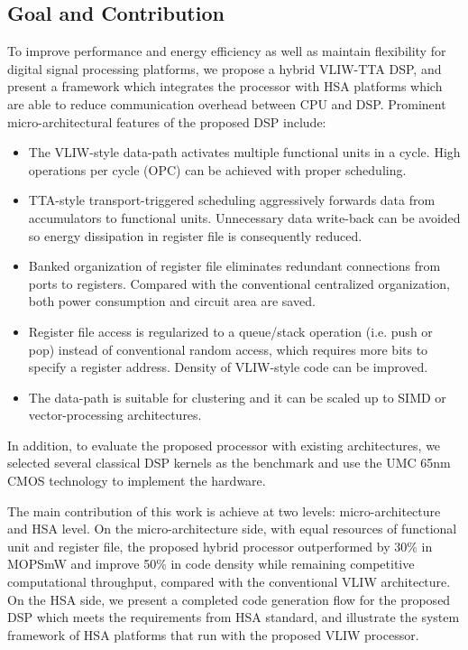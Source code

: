 \documentclass[12pt]{article}
\begin{document}
\begin{CJK}{UTF8}{bkai}
    \subsection{Goal and Contribution}
        To improve performance and energy efficiency as well as maintain flexibility for digital signal processing platforms, we propose a hybrid VLIW-TTA DSP, and present a framework which integrates the processor with HSA platforms which are able to reduce communication overhead between CPU and DSP. Prominent micro-architectural features of the proposed DSP include:
        \begin{itemize}
            \item The VLIW-style data-path activates multiple functional units in a cycle. High operations per cycle (OPC) can be achieved with proper scheduling.
            \item TTA-style transport-triggered scheduling aggressively forwards data from accumulators to functional units. Unnecessary data write-back can be avoided so energy dissipation in register file is consequently reduced.
            \item Banked organization of register file eliminates redundant connections from ports to registers. Compared with the conventional centralized organization, both power consumption and circuit area are saved.
            \item Register file access is regularized to a queue/stack operation (i.e. push or pop) instead of conventional random access, which requires more bits to specify a register address. Density of VLIW-style code can be improved.
            \item The data-path is suitable for clustering and it can be scaled up to SIMD or vector-processing architectures.
        \end{itemize}
        In addition, to evaluate the proposed processor with existing architectures, we selected several classical DSP kernels \cite{dspstone} \cite{bdti} as the benchmark and use the UMC 65nm CMOS technology to implement the hardware.

        The main contribution of this work is achieve at two levels: micro-architecture and HSA level. 
        On the micro-architecture side, with equal resources of functional unit and register file, the proposed hybrid processor outperformed by 30\% in MOPS\/mW and improve 50\% in code density while remaining competitive computational throughput, compared with the conventional VLIW architecture.
        On the HSA side, we present a completed code generation flow for the proposed DSP which meets the requirements from HSA standard, and illustrate the system framework of HSA platforms that run with the proposed VLIW processor.
 

\end{CJK}
\end{document}
